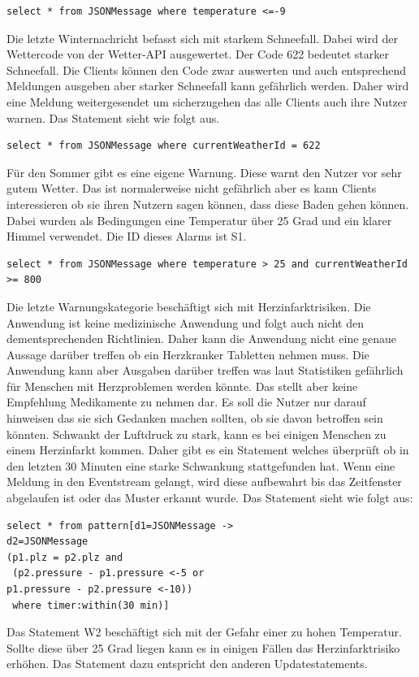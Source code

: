 \begin{lstlisting}
select * from JSONMessage where temperature <=-9
\end{lstlisting}
Die letzte Winternachricht befasst sich mit starkem Schneefall. Dabei wird der Wettercode von der Wetter-API ausgewertet. Der Code 622 bedeutet starker Schneefall. Die Clients können den Code zwar auswerten und auch entsprechend Meldungen ausgeben aber starker Schneefall kann gefährlich werden. Daher wird eine Meldung weitergesendet um sicherzugehen das alle Clients auch ihre Nutzer warnen. Das Statement sieht wie folgt aus. 
\begin{lstlisting}
select * from JSONMessage where currentWeatherId = 622
\end{lstlisting}  
Für den Sommer gibt es eine eigene Warnung. Diese warnt den Nutzer vor sehr gutem Wetter. Das ist normalerweise nicht gefährlich aber es kann Clients interessieren ob sie ihren Nutzern sagen können, dass diese Baden gehen können. Dabei wurden als Bedingungen eine Temperatur über 25 Grad und ein klarer Himmel verwendet. Die ID dieses Alarms ist S1. 
\begin{lstlisting}
select * from JSONMessage where temperature > 25 and currentWeatherId >= 800
\end{lstlisting}
Die letzte Warnungskategorie beschäftigt sich mit Herzinfarktrisiken. Die Anwendung ist keine medizinische Anwendung und folgt auch nicht den dementsprechenden Richtlinien. Daher kann die Anwendung nicht eine genaue Aussage darüber treffen ob ein Herzkranker Tabletten nehmen muss. Die Anwendung kann aber Ausgaben darüber treffen was laut Statistiken gefährlich für Menschen mit Herzproblemen werden könnte. Das stellt aber keine Empfehlung Medikamente zu nehmen dar. Es soll die Nutzer nur darauf hinweisen das sie sich Gedanken machen sollten, ob sie davon betroffen sein könnten. 
Schwankt der Luftdruck zu stark, kann es bei einigen Menschen zu einem Herzinfarkt kommen. Daher gibt es ein Statement welches überprüft ob in den letzten 30 Minuten eine starke Schwankung stattgefunden hat. Wenn eine Meldung in den Eventstream gelangt, wird diese aufbewahrt bis das Zeitfenster abgelaufen ist oder das Muster erkannt wurde. Das Statement sieht wie folgt aus:

\begin{lstlisting}
select * from pattern[d1=JSONMessage ->
d2=JSONMessage
(p1.plz = p2.plz and
 (p2.pressure - p1.pressure <-5 or 
p1.pressure - p2.pressure <-10))
 where timer:within(30 min)]
\end{lstlisting} Das Statement W2 beschäftigt sich mit der Gefahr einer zu hohen Temperatur. Sollte diese über 25 Grad liegen kann es in einigen Fällen das Herzinfarktrisiko erhöhen. Das Statement dazu entspricht den anderen Updatestatements. 

